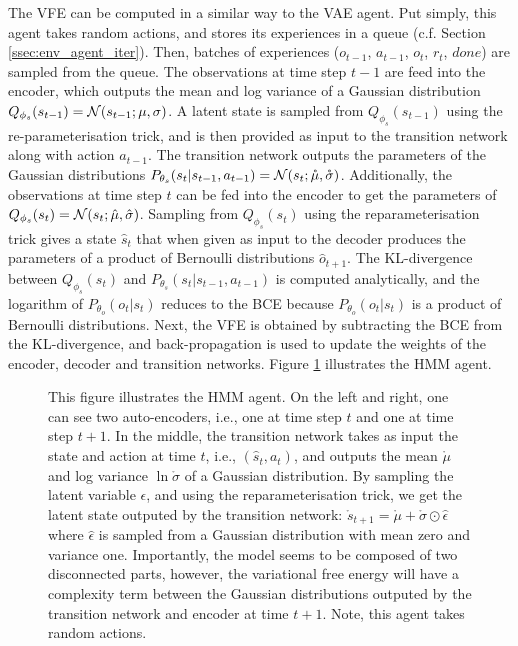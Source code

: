 \documentclass[twoside,11pt]{article}
\let\oldmathcal\mathcal
\renewcommand{\mathcal}[1]{%
  \IfSubStr{ABCDEFGHIJKLMNOPQRSTUVWXYZ}{#1}{\oldmathcal{#1}}{\mathdutchcal{#1}}
}
\begin{document}
The VFE can be computed in a similar way to the VAE agent. Put simply, this agent takes random actions, and stores its experiences in a queue (c.f. Section \ref{ssec:env_agent_iter}). Then, batches of experiences ($o_{t-1}$, $a_{t-1}$, $o_t$, $r_t$, $done$) are sampled from the queue. The observations at time step $t - 1$ are feed into the encoder, which outputs the mean and log variance of a Gaussian distribution $Q_{\phi_s}(s_{t-1}) = \mathcal{N}(s_{t-1};\mu, \sigma)$. A latent state is sampled from $Q_{\phi_s}(s_{t-1})$ using the re-parameterisation trick, and is then provided as input to the transition network along with action $a_{t-1}$. The transition network outputs the parameters of the Gaussian distributions $P_{\theta_s}(s_t|s_{t-1},a_{t-1}) = \mathcal{N}(s_t;\mathring{\mu}, \mathring{\sigma})$. Additionally, the observations at time step $t$ can be fed into the encoder to get the parameters of $Q_{\phi_s}(s_t) = \mathcal{N}(s_t;\hat{\mu}, \hat{\sigma})$. Sampling from $Q_{\phi_s}(s_t)$ using the reparameterisation trick gives a state $\hat{s}_t$ that when given as input to the decoder produces the parameters of a product of Bernoulli distributions $\hat{o}_{t+1}$. The KL-divergence between $Q_{\phi_s}(s_t)$ and $P_{\theta_s}(s_t|s_{t-1},a_{t-1})$ is computed analytically, and the logarithm of $P_{\theta_o}(o_t|s_t)$ reduces to the BCE because $P_{\theta_o}(o_t|s_t)$ is a product of Bernoulli distributions. Next, the VFE is obtained by subtracting the BCE from the KL-divergence, and back-propagation is used to update the weights of the encoder, decoder and transition networks. Figure \ref{fig:HMM} illustrates the HMM agent. 

\begin{figure}[h]
	\begin{center}
	\end{center}
	\caption{This figure illustrates the HMM agent. On the left and right, one can see two auto-encoders, i.e., one at time step $t$ and one at time step $t+1$. In the middle, the transition network takes as input the state and action at time $t$, i.e., $(\hat{s}_t, a_t)$, and outputs the mean $\mathring{\mu}$ and log variance $\ln\mathring{\sigma}$ of a Gaussian distribution. By sampling the latent variable $\epsilon$, and using the reparameterisation trick, we get the latent state outputed by the transition network: $\mathring{s}_{t+1} = \mathring{\mu} + \mathring{\sigma} \odot \hat{\epsilon}$ where $\hat{\epsilon}$ is sampled from a Gaussian distribution with mean zero and variance one. Importantly, the model seems to be composed of two disconnected parts, however, the variational free energy will have a complexity term between the Gaussian distributions outputed by the transition network and encoder at time $t+1$. Note, this agent takes random actions.}
   \label{fig:HMM}
\end{figure}
\end{document}
